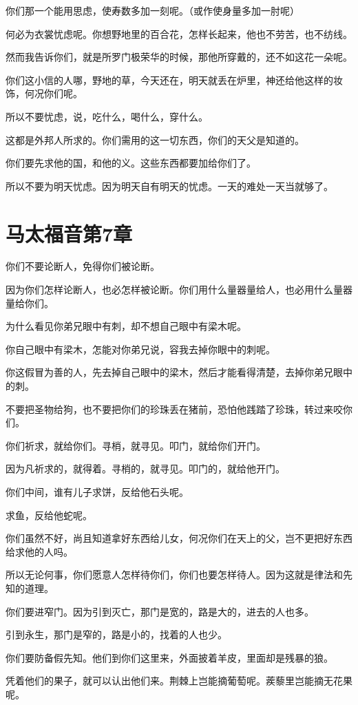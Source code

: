 \documentclass[12pt,oneside]{book}
\begin{document}
你们那一个能用思虑，使寿数多加一刻呢。（或作使身量多加一肘呢）

何必为衣裳忧虑呢。你想野地里的百合花，怎样长起来，他也不劳苦，也不纺线。

然而我告诉你们，就是所罗门极荣华的时候，那他所穿戴的，还不如这花一朵呢。

你们这小信的人哪，野地的草，今天还在，明天就丢在炉里，神还给他这样的妆饰，何况你们呢。

所以不要忧虑，说，吃什么，喝什么，穿什么。

这都是外邦人所求的。你们需用的这一切东西，你们的天父是知道的。

你们要先求他的国，和他的义。这些东西都要加给你们了。

所以不要为明天忧虑。因为明天自有明天的忧虑。一天的难处一天当就够了。

\chapter{马太福音第7章}
你们不要论断人，免得你们被论断。

因为你们怎样论断人，也必怎样被论断。你们用什么量器量给人，也必用什么量器量给你们。

为什么看见你弟兄眼中有刺，却不想自己眼中有梁木呢。

你自己眼中有梁木，怎能对你弟兄说，容我去掉你眼中的刺呢。

你这假冒为善的人，先去掉自己眼中的梁木，然后才能看得清楚，去掉你弟兄眼中的刺。

不要把圣物给狗，也不要把你们的珍珠丢在猪前，恐怕他践踏了珍珠，转过来咬你们。

你们祈求，就给你们。寻梢，就寻见。叩门，就给你们开门。

因为凡祈求的，就得着。寻梢的，就寻见。叩门的，就给他开门。

你们中间，谁有儿子求饼，反给他石头呢。

求鱼，反给他蛇呢。

你们虽然不好，尚且知道拿好东西给儿女，何况你们在天上的父，岂不更把好东西给求他的人吗。

所以无论何事，你们愿意人怎样待你们，你们也要怎样待人。因为这就是律法和先知的道理。

你们要进窄门。因为引到灭亡，那门是宽的，路是大的，进去的人也多。

引到永生，那门是窄的，路是小的，找着的人也少。

你们要防备假先知。他们到你们这里来，外面披着羊皮，里面却是残暴的狼。

凭着他们的果子，就可以认出他们来。荆棘上岂能摘葡萄呢。蒺藜里岂能摘无花果呢。
\end{document}
